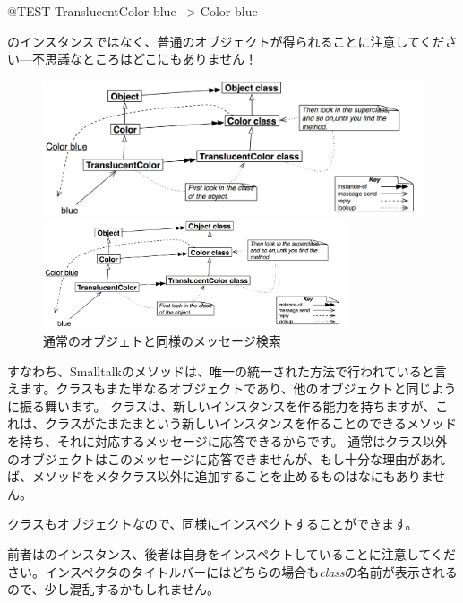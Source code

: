 \documentclass[a4paper,10pt,twoside]{book}
\begin{document}
\begin{code}{@TEST}
TranslucentColor blue --> Color blue
\end{code}
\noindent
{}のインスタンスではなく、普通のオブジェクトが得られることに注意してください\、---\、不思議なところはどこにもありません！

\begin{center}
\begin{figure}[!ht]
\ifluluelse
	{\centerline {\includegraphics[width=\textwidth]{TranslucentColorBlue}}}
	{\centerline {\includegraphics[width=0.8\textwidth]{TranslucentColorBlue}}}
\caption{通常のオブジェトと同様のメッセージ検索}
\end{figure}
\end{center}

すなわち、Smalltalkのメソッドは、唯一の統一された方法で行われていると言えます。クラスもまた単なるオブジェクトであり、他のオブジェクトと同じように振る舞います。
クラスは、新しいインスタンスを作る能力を持ちますが、これは、クラスがたまたまという新しいインスタンスを作ることのできるメソッドを持ち、それに対応するメッセージに応答できるからです。
通常はクラス以外のオブジェクトはこのメッセージに応答できませんが、もし十分な理由があれば、メソッドをメタクラス以外に追加することを止めるものはなにもありません。

クラスもオブジェクトなので、同様にインスペクトすることができます。


\noindent
前者はのインスタンス、後者は自身をインスペクトしていることに注意してください。インスペクタのタイトルバーにはどちらの場合も\emph{class}の名前が表示されるので、少し混乱するかもしれません。
\end{document}
